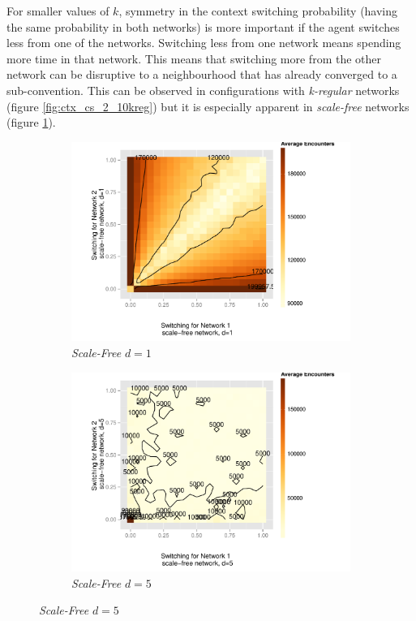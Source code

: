 \documentclass[preprint,number]{elsarticle}
\begin{document}
      \noindent For smaller values of $k$, symmetry in the context switching probability (having the
      same probability in both networks) is more important if the agent switches less from one of
      the networks. Switching less from one network means spending more time in that network. This
      means that switching more from the other network can be disruptive to a neighbourhood that has
      already converged to a sub-convention. This can be observed in configurations with
      \textit{k-regular} networks (figure \ref{fig:ctx_cs_2_10kreg}) but it is especially apparent
      in \textit{scale-free} networks (figure \ref{fig:ctx_cs_2_sf_d1}).

      \begin{figure}[H]
        \centering
	\begin{subfigure}{0.49\linewidth}
          \centering
          \includegraphics[width=1\linewidth]{"../analysis/pdf/context_switching_2_sf_d1_switching_contour"}
          \caption{\textit{Scale-Free} $d=1$}
          \label{fig:ctx_cs_2_sf_d1}
	\end{subfigure}%
	\begin{subfigure}{0.49\linewidth}
          \centering
          \includegraphics[width=1\linewidth]{"../analysis/pdf/context_switching_2_sf_d5_switching_contour"}
          \caption{\textit{Scale-Free} $d=5$}
          \label{fig:ctx_cs_2_sf_d5}
	\end{subfigure}
	

\end{figure}
\end{document}
